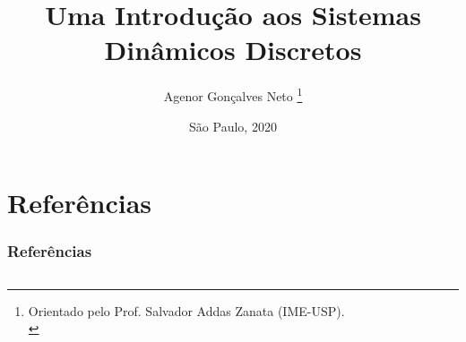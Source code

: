 \documentclass[11pt, portuguese, aspectratio=1610]{beamer}
\title{Uma Introdução aos Sistemas Dinâmicos Discretos}\author{Agenor Gonçalves Neto \footnote{Orientado pelo Prof. Salvador Addas Zanata (IME-USP).\\}}
\date{São Paulo, 2020}
\begin{document}

\begin{frame}
\titlepage
\end{frame}











\section*{Referências}
\begin{frame}
\vspace{5pt}
\frametitle{Referências}
\begin{columns}
\column{\dimexpr\paperwidth-15pt}
\nocite{burns, devaney, holmgren}


\end{columns}
\end{frame}
\end{document}
